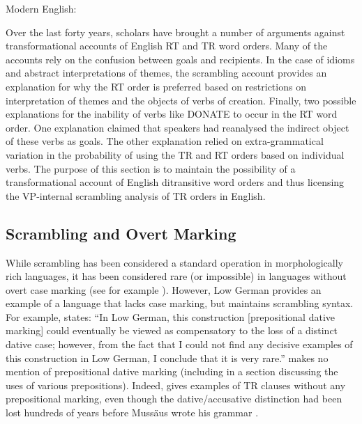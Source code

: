 \begin{exe}
	\ex Modern English:\label{ex:en-donate}
	\begin{xlist}
		\label{ex:kidney}
		\label{ex:donate-inanim}
	\end{xlist}
\end{exe}

Over the last forty years, scholars have brought a number of arguments against transformational accounts of English RT and TR word orders. Many of the accounts rely on the confusion between goals and recipients. In the case of idioms and abstract interpretations of themes, the scrambling account provides an explanation for why the RT order is preferred based on restrictions on interpretation of themes and the objects of verbs of creation. Finally, two possible explanations for the inability of verbs like DONATE to occur in the RT word order. One explanation claimed that speakers had reanalysed the indirect object of these verbs as goals. The other explanation relied on extra-grammatical variation in the probability of using the TR and RT orders based on individual verbs. The purpose of this section is to maintain the possibility of a transformational account of English ditransitive word orders and thus licensing the VP-internal scrambling analysis of TR orders in English.

\subsection{Scrambling and Overt Marking}

While scrambling has been considered a standard operation in morphologically rich languages, it has been considered rare (or impossible) in languages without overt case marking (see for example \citealt{Weerman.1997}). However, Low German provides an example of a language that lacks case marking, but maintains scrambling syntax. For example, \cite{Fleischer.2006} states: ``In Low German, this construction [prepositional dative marking] could eventually be viewed as compensatory to the loss of a distinct dative case; however, from the fact that I could not find any decisive examples of this construction in Low German, I conclude that it is very rare.'' \cite{Lindow.1998} makes no mention of prepositional dative marking (including in a section discussing the uses of various prepositions). Indeed, \cite{Mussaus.1829} gives examples of TR clauses without any prepositional marking, even though the dative/accusative distinction had been lost hundreds of years before Mussäus wrote his grammar \citep{Lasch.1914,Boden.1993}.

